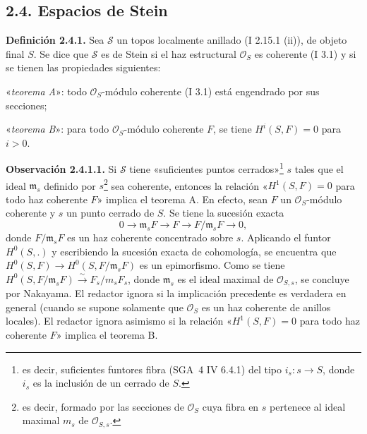 \providecommand{\sisi}[2]{#2}

\subsection*{2.4. Espacios de Stein}

\textbf{Definición 2.4.1.} Sea $\sisi{S}{\mathcal S}$ un topos localmente anillado (I 2.15.1 (ii)), de objeto final $S$. Se dice que $\sisi{S}{\mathcal S}$ es de Stein si el haz estructural $\mathcal O_S$ es coherente (I 3.1) y si se tienen las propiedades siguientes:

«\emph{teorema A}»: todo $\mathcal O_S$-módulo coherente (I 3.1) está engendrado por sus secciones;

«\emph{teorema B}»: para todo $\mathcal O_S$-módulo coherente $F$, se tiene $H^i(S,F)=0$ para $i>0$.

\textbf{Observación 2.4.1.1.} Si $\sisi{S}{\mathcal S}$ tiene «suficientes puntos cerrados»\footnote{es decir, suficientes funtores fibra (SGA~4 IV 6.4.1) del tipo $i_s:s\to S$, donde $i_s$ es la inclusión de un cerrado de $S$.} $s$ tales que el ideal $\mathfrak m_s$ definido por $s$\footnote{es decir, formado por las secciones de $\mathcal O_S$ cuya fibra en $s$ pertenece al ideal maximal $m_s$ de $\mathcal O_{S,s}$.} sea coherente, entonces la relación «$H^1(S,F)=0$ para todo haz coherente $F$» implica el teorema A. En efecto, sean $F$ un $\mathcal O_S$-módulo coherente y $s$ un punto cerrado de $S$. Se tiene la sucesión exacta
\[
0\longrightarrow\mathfrak m_sF\longrightarrow F\longrightarrow F/\mathfrak m_sF\longrightarrow0,
\]
donde $F/\mathfrak m_sF$ es un haz coherente concentrado sobre $s$. Aplicando el funtor $H^0(S,.)$ y escribiendo la sucesión exacta de cohomología, se encuentra que $H^0(S,F)\longrightarrow H^0(S,F/\mathfrak m_sF)$ es un epimorfismo. Como se tiene $H^0(S,F/\mathfrak m_sF)\xrightarrow{\sim}F_s/m_sF_s$, donde $\mathfrak m_s$ es el ideal maximal de $\mathcal O_{S,s}$, se concluye por Nakayama. El redactor ignora si la implicación precedente es verdadera en general (cuando se supone solamente que $\mathcal O_S$ es un haz coherente de anillos locales). El redactor ignora asimismo si la relación «$H^1(S,F)=0$ para todo haz coherente $F$» implica el teorema B.

